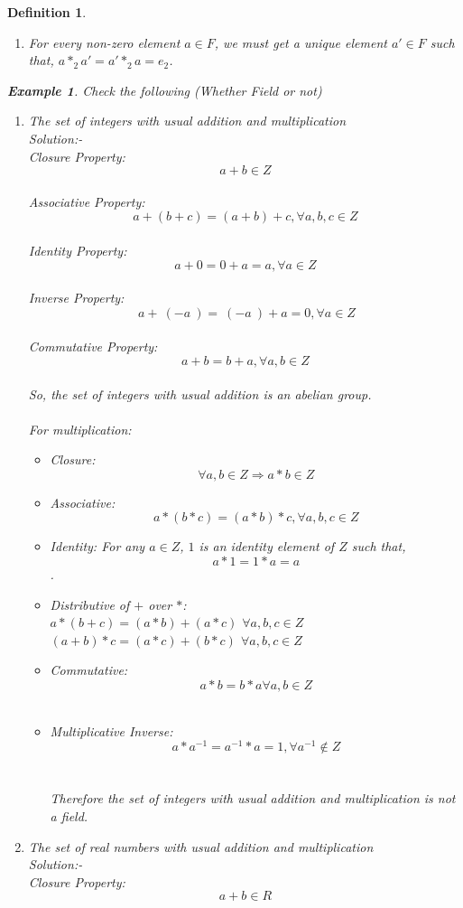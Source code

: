 \documentclass{article}
\newtheorem{defn}{Definition} [section]
\newtheorem{ex}{Example}[section]
\begin{document}
\begin{defn}
\begin{enumerate}
	\item For every non-zero element $a \in F$, we must get a unique element $a'\in F$ such that, $a*_2a'=a'*_2a=e_2$.
\end{enumerate}
\begin{ex} Check the following (Whether Field or not)
\begin{enumerate} 
	\item The set of integers with usual addition and multiplication
	\\ Solution:- 	\\Closure Property: $$a+b \in Z$$
	\\Associative Property: $$a+(b+c)=(a+b)+c, \forall a,b,c \in Z$$
	\\Identity Property: $$a+0=0+a=a, \forall a \in Z$$
	\\Inverse Property: $$ \ a + \ (-a\ ) =\ (-a\ ) + a = 0, \forall a \in Z$$
	\\Commutative Property: $$a+b=b+a,\forall a,b \in Z$$
	\\So, the set of integers with usual addition is an abelian group.\\
	\\For multiplication:
	\begin{itemize}
	    \item Closure: $$\forall a, b \in Z \Rightarrow a*b \in Z$$
        \item Associative: $$a*(b*c)=(a*b)*c, \forall a,b,c \in Z$$
	    \item Identity: For any $a \in Z$, $1$ is an identity element of $Z$ such that, $$a*1=1*a=a$$ .
		\item Distributive of $+$ over $*$:\\
	        $a*(b+c)=(a*b)+ (a*c)$  $ \forall a,b,c \in Z $ \\
	        $(a+b)*c=(a*c)+(b*c)$   $ \forall a,b,c \in Z $ \\
	   \item Commutative: $$a*b=b*a  \forall a,b \in Z$$ \\
	   \item Multiplicative Inverse: $$a*a^{-1}= a^{-1} * a = 1 , \forall a^{-1} \notin Z$$\\
	    \\Therefore the set of integers with usual addition and multiplication is not a field.
	 \end{itemize}
	\item The set of real numbers with usual addition and multiplication
	\\ Solution:- 	\\Closure Property: $$a+b \in R$$

\end{enumerate}
\end{ex}
\end{defn}
\end{document}
